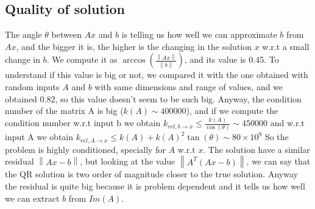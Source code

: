 \documentclass{article}
\begin{document}
\subsection{Quality of solution}\label{subsec:quality-of-solution}
The angle $\theta$ between $Ax$ and $b$ is telling us how well we can approximate $b$ from $Ax$, and the bigger it is, the higher is the changing in the solution $x$ w.r.t a small change in $b$.
We compute it as $\arccos(\frac{\left\lVert Ax \right\rVert}{\left\lVert b \right\rVert})$, and its value is 0.45.
To understand if this value is big or not, we compared it with the one obtained with random inputs $A$ and $b$ with same dimensions and range of values, and we obtained 0.82, so this value doesn't seem to be such big.
Anyway, the condition number of the matrix A is big ($k(A) \sim 400000$), and if we compute the condition number w.r.t input b we obtain $k_{rel, b\rightarrow x} \leq \frac{k(A)}{\cos(\theta)} \sim 450000$ and w.r.t input A we obtain $k_{rel, A \rightarrow x} \leq k(A) + k(A)^{2} \tan(\theta) \sim 80\times 10^{9}$
So the problem is highly conditioned, specially for $A$ w.r.t $x$.
The solution have a similar residual $\left\lVert Ax - b \right\rVert$, but looking at the value $\left\lVert A^{T}(Ax - b)\right\rVert$, we can say that the QR solution is two order of magnitude closer to the true solution.
Anyway the residual is quite big because it is problem dependent and it tells us how well we can extract $b$ from $Im(A)$.
\end{document}
